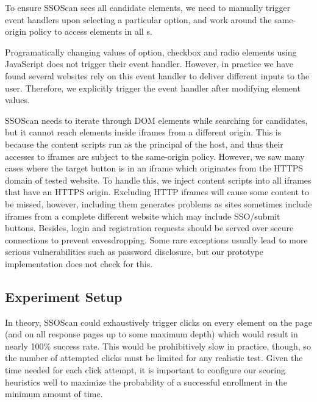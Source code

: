 To ensure SSOScan sees all candidate elements, we need to manually trigger event handlers upon selecting a particular option, and work around the same-origin policy to access elements in all s.

 Programatically changing values of option, checkbox and radio elements using JavaScript does not trigger their  event handler.  However, in practice we have found several websites rely on this event handler to deliver different inputs to the user.  Therefore, we explicitly trigger the event handler after modifying element values.

 SSOScan needs to iterate through DOM elements while searching for candidates, but it cannot reach elements inside iframes from a different origin.  This is because the content scripts run as the principal of the host, and thus their accesses to iframes are subject to the same-origin policy.  However, we saw many cases where the target button is in an iframe which originates from the HTTPS domain of tested website.  To handle this, we inject content scripts into all iframes that have an HTTPS origin.  Excluding HTTP iframes will cause some content to be missed, however, including them generates problems as sites sometimes include iframes from a complete different website which may include SSO/submit buttons.  Besides, login and registration requests should be served over secure connections to prevent eavesdropping.  Some rare exceptions usually lead to more serious vulnerabilities such as password disclosure, but our prototype implementation does not check for this.

\subsection{Experiment Setup}
\label{sec:ssoscan_heuristics_heuristicsEval}

In theory, SSOScan could exhaustively trigger clicks on every element on the page (and on all response pages up to some maximum depth) which would result in nearly 100\% success rate.  This would be prohibitively slow in practice, though, so the number of attempted clicks must be limited for any realistic test.  Given the time needed for each click attempt, it is important to configure our scoring heuristics well to maximize the probability of a successful enrollment in the minimum amount of time.  

